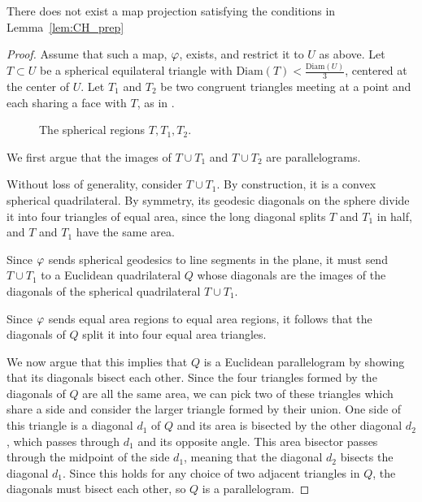 \begin{theorem}
	There does not exist a map projection satisfying the 
	conditions in Lemma~\ref{lem:CH_prep}
\end{theorem}
\begin{proof}
	Assume that such a map, $\varphi$, exists, and restrict 
	it to $U$ as above. Let $T\subset U$ be a 
	spherical equilateral triangle with 
	$\mathrm{Diam}(T)<\frac{\mathrm{Diam}(U)}{3}$, centered at 
	the center of $U$. Let $T_1$ and $T_2$ be two 
	congruent triangles meeting at a point and 
	each sharing a face with $T$, as in .

\begin{figure}[h]
	\centering
	
	\caption{The spherical regions $T,T_1,T_2$.}
	\label{fig:sphtris}
\end{figure}












We first argue that the images of $T\cup T_1$ and $T\cup T_2$ are parallelograms.

Without loss of generality, consider $T\cup T_1$.  By construction, it is a 
convex spherical quadrilateral. By symmetry, its geodesic 
diagonals on the sphere divide it into four triangles of equal area, since the long diagonal splits $T$ and $T_1$ in 
half, and $T$ and $T_1$ have the same area.


		Since $\varphi$ sends spherical geodesics to line segments in the plane, it must send 
		$T\cup T_1$ to a Euclidean quadrilateral $Q$ whose diagonals 
		are the images of the diagonals of the spherical quadrilateral $T\cup T_1$.
		
		 Since 
		$\varphi$ sends equal area regions to equal area 
		regions, it follows that the diagonals 
		of $Q$ split it into four equal area triangles.
		
		We now argue that this implies that $Q$ is a Euclidean parallelogram by showing that its diagonals bisect each other.  Since the four triangles 
		formed by the diagonals of $Q$ are all the same area, we can pick two of these triangles which share a side 
		and consider the larger triangle formed by their union.  One side of this triangle is a diagonal $d_1$ of $Q$ and its area is 
		bisected by the other diagonal $d_2$, which passes through $d_1$ and its opposite angle.  This area bisector passes through the midpoint of the side $d_1$, meaning that the diagonal $d_2$ bisects the diagonal $d_1$.  Since this holds for any choice of two adjacent triangles in $Q$, the diagonals must bisect each other, so $Q$ is a parallelogram.
		

\end{proof}
